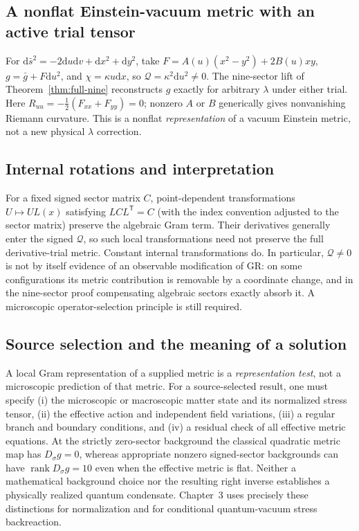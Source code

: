 \documentclass[11pt,a4paper]{article}
\newcommand{\dd}{\mathrm d}
\begin{document}
\subsection{A nonflat Einstein-vacuum metric with an active trial tensor}
For \(\dd\bar s^2=-2\dd u\dd v+\dd x^2+\dd y^2\), take \(F=A(u)(x^2-y^2)+2B(u)xy\), \(g=\bar g+F\dd u^2\), and \(\chi=\kappa u\dd x\), so \(\mathcal Q=\kappa^2\dd u^2\ne0\). The nine-sector lift of Theorem~\ref{thm:full-nine} reconstructs \(g\) exactly for arbitrary \(\lambda\) under either trial. Here \(R_{uu}=-\tfrac12(F_{xx}+F_{yy})=0\); nonzero \(A\) or \(B\) generically gives nonvanishing Riemann curvature. This is a nonflat \emph{representation} of a vacuum Einstein metric, not a new physical \(\lambda\) correction.

\subsection{Internal rotations and interpretation}
For a fixed signed sector matrix \(C\), point-dependent transformations \(U\mapsto UL(x)\) satisfying \(LCL^{\mathsf T}=C\) (with the index convention adjusted to the sector matrix) preserve the algebraic Gram term. Their derivatives generally enter the signed \(\mathcal Q\), so such local transformations need not preserve the full derivative-trial metric. Constant internal transformations do. In particular, \(\mathcal Q\ne0\) is not by itself evidence of an observable modification of GR: on some configurations its metric contribution is removable by a coordinate change, and in the nine-sector proof compensating algebraic sectors exactly absorb it. A microscopic operator-selection principle is still required.


\subsection*{Source selection and the meaning of a solution}\label{sec:qgd064-source-select}
A local Gram representation of a supplied metric is a \emph{representation test}, not a microscopic prediction of that metric. For a source-selected result, one must specify (i) the microscopic or macroscopic matter state and its normalized stress tensor, (ii) the effective action and independent field variations, (iii) a regular branch and boundary conditions, and (iv) a residual check of all effective metric equations.  At the strictly zero-sector background the classical quadratic metric map has $D_\sigma g=0$, whereas appropriate nonzero signed-sector backgrounds can have $\operatorname{rank}D_\sigma g=10$ even when the effective metric is flat. Neither a mathematical background choice nor the resulting right inverse establishes a physically realized quantum condensate.  Chapter~3 uses precisely these distinctions for normalization and for conditional quantum-vacuum stress backreaction.
\end{document}
